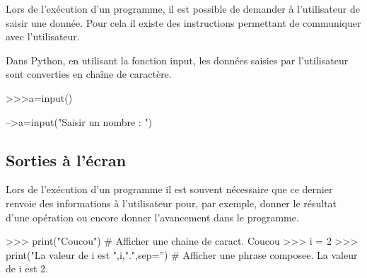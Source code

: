 \documentclass[11pt,oneside]{article}
\begin{document}
Lors de l'exécution d'un programme, il est possible de demander à l'utilisateur de saisir une donnée. Pour cela il existe des instructions permettant de communiquer avec l'utilisateur.

\begin{exemple}
\begin{minipage}[c]{.45\linewidth}
Dans Python, en utilisant la fonction \textsf{input}, les données saisies par l'utilisateur sont converties en chaîne de caractère.
\begin{py}
\begin{python}
>>>a=input()
\end{python}
\end{py}
\end{minipage}\hfill
\begin{minipage}[c]{.45\linewidth}
\end{minipage}
\begin{sci}
\begin{scilab}
-->a=input("Saisir un nombre : ")
\end{scilab}
\end{sci}
\end{exemple}

\subsection{Sorties à l'écran}
Lors de l'exécution d'un programme il est souvent nécessaire que ce dernier renvoie des informations à l'utilisateur pour, par exemple, donner le résultat d'une opération ou encore donner l'avancement dans le programme.

\begin{exemple}
\begin{minipage}[c]{.95\linewidth}
\begin{py}
\begin{python}
>>> print("Coucou") # Afficher une chaine de caract.
    Coucou
>>> i = 2
>>> print("La valeur de i est ",i,".",sep='') # Afficher une phrase composee.
    La valeur de i est 2.
\end{python}
\end{py}
\end{minipage}

\begin{minipage}[c]{.45\linewidth}
\end{minipage}

\end{exemple}
\end{document}
